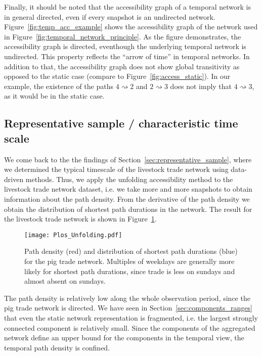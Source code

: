 Finally, it should be noted that the accessibility graph of a temporal network is in general directed, even if every snapshot is an undirected network.
Figure~\ref{fig:temp_acc_example} shows the accessibility graph of the network used in Figure~\ref{fig:temporal_network_principle}.
As the figure demonstrates, the accessibility graph is directed, eventhough the underlying temporal network is undirected.
This property reflects the ``arrow of time'' in temporal networks.
In addition to that, the accessibility graph does not show global transitivity as opposed to the static case (compare to Figure~\ref{fig:access_static}).
In our example, the existence of the paths $4\rightsquigarrow 2$ and $2\rightsquigarrow 3$ does not imply that $4\rightsquigarrow 3$, as it would be in the static case.
 
\subsection{Representative sample / characteristic time scale}\label{sec:characteristic_timescale}
We come back to the the findings of Section~\ref{sec:representative_sample}, where we determined the typical timescale of the livestock trade network using data-driven methods.
Thus, we apply the unfolding accessibility method to the livestock trade network dataset, i.e. we take more and more snapshots to obtain information about the path density.
From the derivative of the path density we obtain the distribution of shortest path durations in the network.
The result for the livestock trade network is shown in Figure~\ref{fig:plos_unfolding}.
%
\begin{figure}[htb]
\begin{center}
\texttt{[image: Plos\_Unfolding.pdf]}
\caption{Path density (red) and distribution of shortest path durations (blue) for the pig trade network.
Multiples of weekdays are generally more likely for shortest path durations, since trade is less on sundays and almost absent on sundays.}
\label{fig:plos_unfolding}
\end{center}
\end{figure}
%
The path density is relatively low along the whole observation period, since the pig trade network is directed.
We have seen in Section~\ref{sec:components_ranges} that even the static network representation is fragmented, i.e. the largest strongly connected component is relatively small.
Since the components of the aggregated network define an upper bound for the components in the temporal view, the temporal path density is confined.

